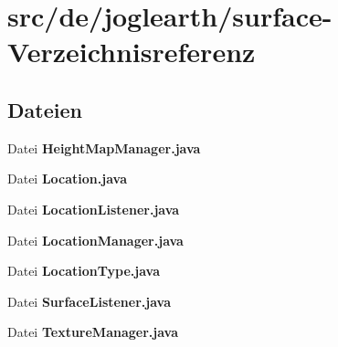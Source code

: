 \section{src/de/joglearth/surface-\/\-Verzeichnisreferenz}
\label{dir_bd6375927fdf4ab10a048231f7b8ce3b}
\subsection*{Dateien}
\begin{DoxyCompactItemize}
\item 
Datei {\bfseries Height\-Map\-Manager.\-java}
\item 
Datei {\bfseries Location.\-java}
\item 
Datei {\bfseries Location\-Listener.\-java}
\item 
Datei {\bfseries Location\-Manager.\-java}
\item 
Datei {\bfseries Location\-Type.\-java}
\item 
Datei {\bfseries Surface\-Listener.\-java}
\item 
Datei {\bfseries Texture\-Manager.\-java}
\end{DoxyCompactItemize}
